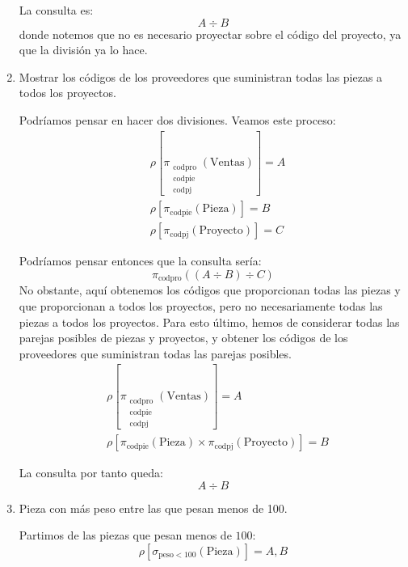 \begin{ejercicio}
\begin{enumerate}
        La consulta es:
        \begin{equation*}
            A\div B
        \end{equation*}
        donde notemos que no es necesario proyectar sobre el código del proyecto, ya que la división ya lo hace.
        \item Mostrar los códigos de los proveedores que suministran todas las piezas a todos los proyectos.
        
        Podríamos pensar en hacer dos divisiones. Veamos este proceso:
        \begin{align*}
            &\rho\left[\pi_{\substack{\text{codpro}\\\text{codpie}\\\text{codpj}}}\left(\text{Ventas}\right)\right]=A\\
            &\rho\left[\pi_{\text{codpie}}(\text{Pieza})\right]=B\\
            &\rho\left[\pi_{\text{codpj}}(\text{Proyecto})\right]=C
        \end{align*}

        Podríamos pensar entonces que la consulta sería:
        \begin{equation*}
            \pi_{\text{codpro}}((A\div B)\div C)
        \end{equation*}
        No obstante, aquí obtenemos los códigos que proporcionan todas las piezas y que proporcionan a todos los proyectos, pero no necesariamente todas las piezas a todos los proyectos.
        Para esto último, hemos de considerar todas las parejas posibles de piezas y proyectos, y obtener los códigos de los proveedores que suministran todas las parejas posibles.
        \begin{align*}
            &\rho\left[\pi_{\substack{\text{codpro}\\\text{codpie}\\\text{codpj}}}\left(\text{Ventas}\right)\right]=A\\
            &\rho\left[\pi_{\text{codpie}}(\text{Pieza})\times \pi_{\text{codpj}}(\text{Proyecto})\right]=B
        \end{align*}

        La consulta por tanto queda:
        \begin{equation*}
            A\div B
        \end{equation*}
        \item Pieza con más peso entre las que pesan menos de 100.
        
        Partimos de las piezas que pesan menos de $100$:
        \begin{equation*}
            \rho\left[\sigma_{\text{peso}<100}(\text{Pieza})\right]=A,B
        \end{equation*}


\end{enumerate}
\end{ejercicio}
